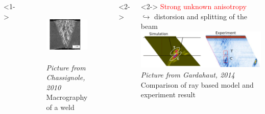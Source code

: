 \documentclass[10pt,xcolor=x11names,compress, notes=show]{beamer}%
\begin{document}
\begin{frame}{\insertsectionhead}
\vspace{-1cm}
\hspace{1cm}
	\begin{columns}[c]
			<1->
			\centering
			\begin{figure}
				\includegraphics[height=2.7cm]{./img/soudure1.png}\\
				{\tiny{ \itshape Picture from Chassignole, 2010} \\ \centering \scriptsize Macrography of a weld }
			\end{figure}
			<2->
			\hspace{-3cm}
			\vspace{2cm}
			<2->
			\hspace{-1cm}
			\textcolor{red}{Strong unknown anisotropy}\\
			$\hookrightarrow$ distorsion and splitting of the beam\\[0.2cm]
			\hspace{-0.5cm}
			\includegraphics[scale=0.5]{img/gardahaut.png}\\
			{\tiny{ \itshape Picture from Gardahaut, 2014} \\ \centering \scriptsize Comparison of ray based model and experiment result } 
				

\end{columns}
\end{frame}
\end{document}
